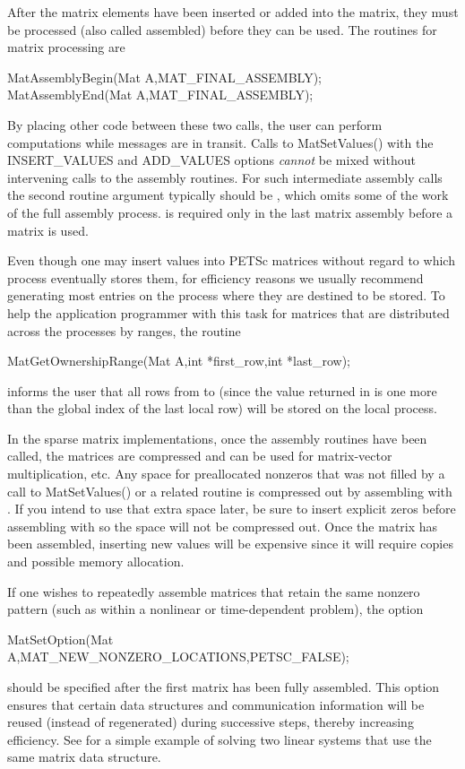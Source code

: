 After the matrix elements have been inserted or added into the matrix,
they must be processed (also called assembled) before they can be used. The routines for matrix
processing are
\begin{tabbing}
  MatAssemblyBegin(Mat A,MAT\_FINAL\_ASSEMBLY);\\
  MatAssemblyEnd(Mat A,MAT\_FINAL\_ASSEMBLY);
\end{tabbing}
By placing other code between these two calls, the user can perform
computations while messages are in transit.
Calls to MatSetValues() with the INSERT\_VALUES and
ADD\_VALUES options {\em cannot} be mixed without intervening calls to
the assembly routines.  For such intermediate assembly calls the
second routine argument  typically should be ,
 which omits some of the work of the full
assembly process.    is
required only in the last matrix assembly before a matrix is used.

Even though one may insert values into PETSc matrices without regard
to which process eventually stores them, for efficiency
reasons we usually recommend generating most entries on the
process where they are destined to be stored.  To help the
application programmer with this task for matrices that are
distributed across the processes by ranges, the routine
\begin{tabbing}
  MatGetOwnershipRange(Mat A,int *first\_row,int *last\_row);
\end{tabbing}
informs the user that all rows from  to
 (since the value returned in  is one more
than the global index of the last local row) will be stored on the local process.

In the sparse matrix implementations, once the assembly routines have been called, the matrices are compressed and can be used for matrix-vector multiplication, etc.
Any space for preallocated nonzeros that was not filled by a call to MatSetValues() or a related routine is compressed out by assembling with .
If you intend to use that extra space later, be sure to insert explicit zeros before assembling with  so the space will not be compressed out.
Once the matrix has been assembled, inserting new values will be expensive since it will require copies and possible memory allocation.

If one wishes to repeatedly assemble matrices that retain the same
nonzero pattern (such as within a nonlinear or time-dependent
problem), the option
\begin{tabbing}
  MatSetOption(Mat A,MAT\_NEW\_NONZERO\_LOCATIONS,PETSC\_FALSE);
\end{tabbing} 
should be specified after the first matrix has been fully assembled.
This option ensures that certain data structures and communication
information will be reused (instead of regenerated) during successive
steps, thereby increasing efficiency.
See  for a simple example of
solving two linear systems that use the same matrix data structure.

